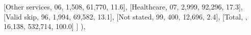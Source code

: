 \documentclass[
  11pt,
  a4paper,
]{article}
\newenvironment{Shaded}{\begin{snugshade}}{\end{snugshade}}
\newcommand{\NormalTok}[1]{\textcolor[rgb]{0.00,0.23,0.31}{#1}}
\newcommand{\StringTok}[1]{\textcolor[rgb]{0.13,0.47,0.30}{#1}}
\begin{document}
\begin{Shaded}
\begin{Highlighting}[]
\NormalTok{                    [}\StringTok{\textquotesingle{}Other services\textquotesingle{}}\NormalTok{, }\StringTok{\textquotesingle{}06\textquotesingle{}}\NormalTok{, }\StringTok{\textquotesingle{}1,508\textquotesingle{}}\NormalTok{, }\StringTok{\textquotesingle{}61,770\textquotesingle{}}\NormalTok{, }\StringTok{\textquotesingle{}11.6\textquotesingle{}}\NormalTok{],}
\NormalTok{                    [}\StringTok{\textquotesingle{}Healthcare\textquotesingle{}}\NormalTok{, }\StringTok{\textquotesingle{}07\textquotesingle{}}\NormalTok{, }\StringTok{\textquotesingle{}2,999\textquotesingle{}}\NormalTok{, }\StringTok{\textquotesingle{}92,296\textquotesingle{}}\NormalTok{, }\StringTok{\textquotesingle{}17.3\textquotesingle{}}\NormalTok{],}
\NormalTok{                    [}\StringTok{\textquotesingle{}Valid skip\textquotesingle{}}\NormalTok{, }\StringTok{\textquotesingle{}96\textquotesingle{}}\NormalTok{, }\StringTok{\textquotesingle{}1,994\textquotesingle{}}\NormalTok{, }\StringTok{\textquotesingle{}69,582\textquotesingle{}}\NormalTok{, }\StringTok{\textquotesingle{}13.1\textquotesingle{}}\NormalTok{],}
\NormalTok{                    [}\StringTok{\textquotesingle{}Not stated\textquotesingle{}}\NormalTok{, }\StringTok{\textquotesingle{}99\textquotesingle{}}\NormalTok{, }\StringTok{\textquotesingle{}400\textquotesingle{}}\NormalTok{, }\StringTok{\textquotesingle{}12,696\textquotesingle{}}\NormalTok{, }\StringTok{\textquotesingle{}2.4\textquotesingle{}}\NormalTok{],}
\NormalTok{                    [}\StringTok{\textquotesingle{}Total\textquotesingle{}}\NormalTok{, }\StringTok{\textquotesingle{}\textquotesingle{}}\NormalTok{, }\StringTok{\textquotesingle{}16,138\textquotesingle{}}\NormalTok{, }\StringTok{\textquotesingle{}532,714\textquotesingle{}}\NormalTok{, }\StringTok{\textquotesingle{}100.0\textquotesingle{}}\NormalTok{]}
\NormalTok{                ]}
\NormalTok{            ),}
            

\end{Highlighting}
\end{Shaded}
\end{document}
